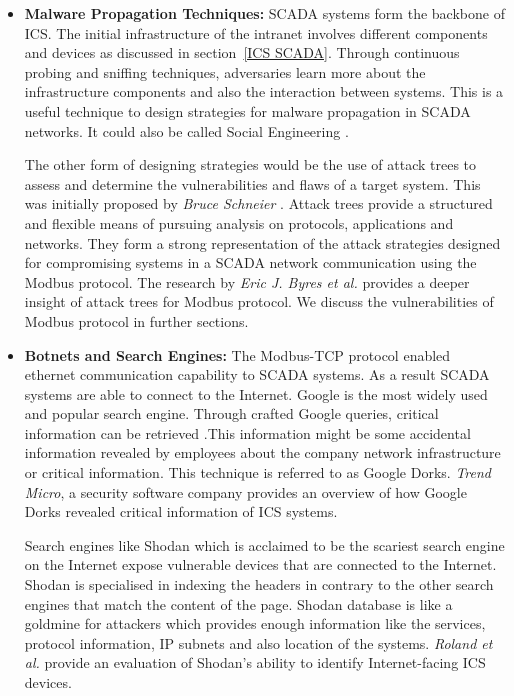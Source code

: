 \documentclass[article,msc=informatik,type=msc,colorback,accentcolor=tud9c]{tudthesis}
\begin{document}
\begin{itemize}
	 \vspace{5mm}
	 \item\textbf{Malware Propagation Techniques:} SCADA systems form the backbone of \ac{ICS}. The initial infrastructure of the intranet involves different components and devices as discussed in section~\ref{ICS SCADA}. Through continuous probing and sniffing techniques, adversaries learn more about the infrastructure components and also the interaction between systems. This is a useful technique to design strategies for malware propagation in SCADA networks. It could also be called Social Engineering \cite{Thornburgh:2004:SED:1059524.1059554}.
	 
	  The other form of designing strategies would be the use of attack trees to assess and determine the vulnerabilities and flaws of a target system. This was initially proposed by \textit{Bruce Schneier} \cite{schneier1999attack}. Attack trees provide a structured and flexible means of pursuing analysis on protocols, applications and networks. They form a strong representation of the attack strategies designed for compromising systems in a \ac{SCADA} network communication using the Modbus protocol. The research by \textit{ Eric J. Byres et al.} \cite{byres2004use}provides a deeper insight of attack trees for Modbus protocol. We discuss the vulnerabilities of Modbus protocol in further sections. 
	 \vspace{5mm}
	 \item\textbf{Botnets and Search Engines:} The Modbus-TCP protocol enabled ethernet communication capability to \ac{SCADA} systems. As a result \ac{SCADA} systems are able to connect to the Internet. Google is the most widely used and popular search engine. Through crafted Google queries, critical information can be retrieved .This information might be some accidental information revealed by employees about the company network infrastructure or critical information. This technique is referred to as Google Dorks. \textit{Trend Micro}, a security software company provides an overview of how Google Dorks revealed critical information of \ac{ICS} systems\cite{wilhoit2013s}.  
	 
	 Search engines like Shodan which is acclaimed to be the scariest search engine \cite{goldman2013shodan}on the Internet expose vulnerable devices that are connected to the Internet.  Shodan is specialised in indexing the headers in contrary to the other search engines that match the content of the page. Shodan database is like a goldmine for attackers which provides enough information like the services, protocol information, \ac{IP} subnets and also location of the systems. \textit{Roland et al.} \cite{bodenheim2014evaluation} provide an evaluation of Shodan's  ability to identify Internet-facing \ac{ICS} devices.
	 

\end{itemize}
\end{document}
